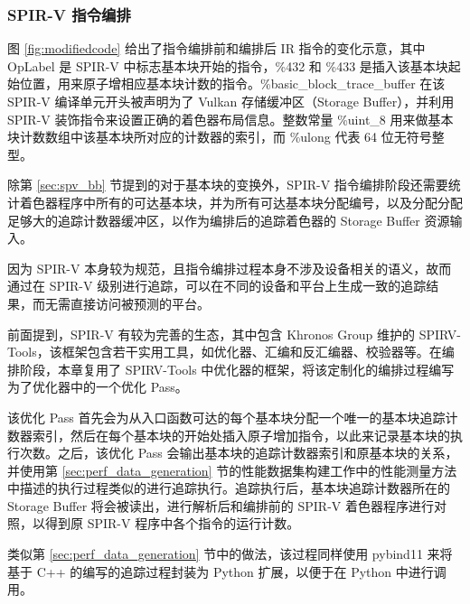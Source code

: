 \subsubsection{SPIR-V 指令编排}
\label{subsec:spv_instrumentation}

图 \ref{fig:modifiedcode} 给出了指令编排前和编排后 IR 指令的变化{\amend 示意}，其中 OpLabel 是 SPIR-V 中标志基本块开始的指令，\%432 和 \%433 是插入该基本块起始位置，用来原子增相应基本块计数的指令。\%basic\_block\_trace\_buffer 在该 SPIR-V 编译单元开头被声明为了 Vulkan 存储缓冲区（Storage Buffer），并利用 SPIR-V 装饰指令来设置正确的着色器布局信息。整数常量 \%uint\_8 用来做基本块计数数组中该基本块所对应的计数器的索引，而 \%ulong 代表 64 位无符号整型。

除第 \ref{sec:spv_bb} 节提到的对于基本块的变换外，SPIR-V 指令编排阶段还需要统计着色器程序中所有的可达基本块，并为所有可达基本块分配编号，以及分配分配足够大的追踪计数器缓冲区，以作为编排后的追踪着色器的 Storage Buffer 资源输入。

因为 SPIR-V 本身较为规范，且指令编排过程本身不涉及设备相关的语义，故而通过在 SPIR-V 级别进行追踪，可以在不同的设备和平台上生成一致的追踪结果，而无需直接访问被预测的平台。

前面提到，SPIR-V 有较为完善的生态，其中包含 Khronos Group 维护的 SPIRV-Tools，该框架包含若干实用工具，如优化器、汇编和反汇编器、校验器等。在编排阶段，本章复用了 SPIRV-Tools 中优化器的框架，将该定制化的编排过程{\amend 编写为了}优化器中的一个优化 Pass。

{\amend 该优化 Pass 首先会}为从入口函数可达的每个基本块分配一个唯一的基本块追踪计数器索引，然后在每个基本块的开始处插入原子增加指令，以此来记录基本块的执行次数。之后，该优化 Pass 会输出基本块的追踪计数器索引和原基本块的关系，并使用第 \ref{sec:perf_data_generation} 节{\amend 的性能数据集构建工作中}的性能测量方法中描述的执行过程类似的进行追踪执行。追踪执行后，基本块追踪计数器所在的 Storage Buffer 将会被读出，进行解析{\amend 后}和编排前的 SPIR-V 着色器程序进行对照，{\amend 以}得到原 SPIR-V 程序中各个指令的运行计数。

类似第 \ref{sec:perf_data_generation} 节中的做法，{\amend 该过程}同样使用 pybind11 来将{\amend 基于 C++ 的编写的追踪}过程封装为 Python 扩展，以便于在 Python 中进行调用。

